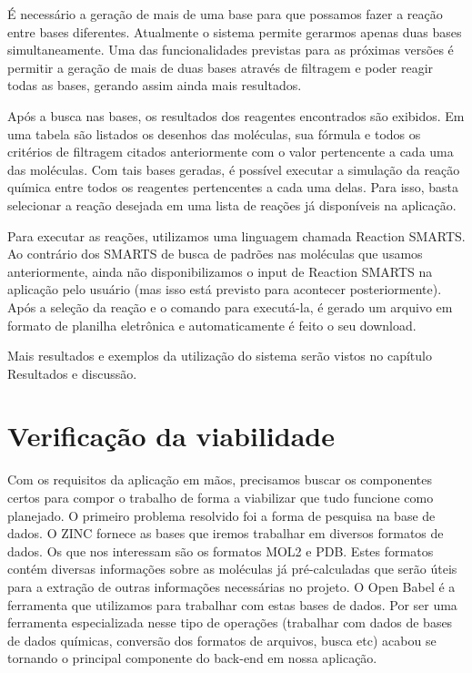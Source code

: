 \documentclass{abnt}
\begin{document}
É necessário a geração de mais de uma base para que possamos fazer a reação entre bases diferentes. Atualmente o sistema permite gerarmos apenas duas bases simultaneamente. Uma das funcionalidades previstas para as próximas versões é permitir a geração de mais de duas bases através de filtragem e poder reagir todas as bases, gerando assim ainda mais resultados.

Após a busca nas bases, os resultados dos reagentes encontrados são exibidos. Em uma tabela são listados os desenhos das moléculas, sua fórmula e todos os critérios de filtragem citados anteriormente com o valor pertencente a cada uma das moléculas. Com tais bases geradas, é possível executar a simulação da reação química entre todos os reagentes pertencentes a cada uma delas. Para isso, basta selecionar a reação desejada em uma lista de reações já disponíveis na aplicação.

Para executar as reações, utilizamos uma linguagem chamada Reaction SMARTS. Ao contrário dos SMARTS de busca de padrões nas moléculas que usamos anteriormente, ainda não disponibilizamos o input de Reaction SMARTS na aplicação pelo usuário (mas isso está previsto para acontecer posteriormente). Após a seleção da reação e o comando para executá-la, é gerado um arquivo em formato de planilha eletrônica e automaticamente é feito o seu download.

Mais resultados e exemplos da utilização do sistema serão vistos no capítulo Resultados e discussão.

\section{Verificação da viabilidade}

Com os requisitos da aplicação em mãos, precisamos buscar os componentes certos para compor o trabalho de forma a viabilizar que tudo funcione como planejado. O primeiro problema resolvido foi a forma de pesquisa na base de dados. O ZINC fornece as bases que iremos trabalhar em diversos formatos de dados. Os que nos interessam são os formatos MOL2 e PDB. Estes formatos contém diversas informações sobre as moléculas já pré-calculadas que serão úteis para a extração de outras informações necessárias no projeto. O Open Babel é a ferramenta que utilizamos para trabalhar com estas bases de dados. Por ser uma ferramenta especializada nesse tipo de operações (trabalhar com dados de bases de dados químicas, conversão dos formatos de arquivos, busca etc) acabou se tornando o principal componente do back-end em nossa aplicação.
\end{document}
